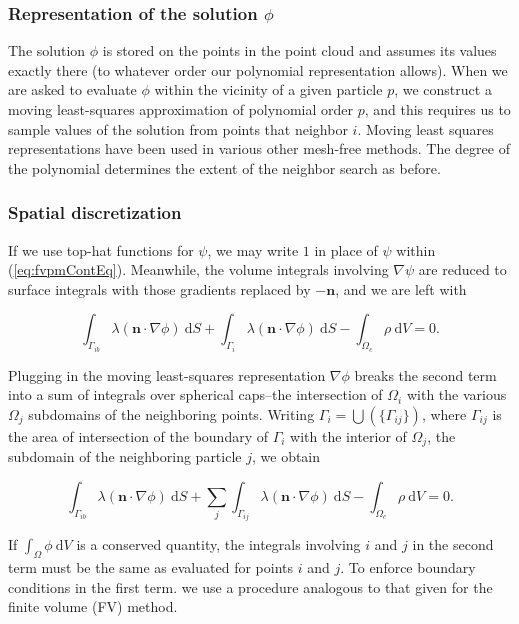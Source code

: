 \documentclass[12pt]{article}
\newcommand{\labelEq}[1]{\label{eq:#1}}
\newcommand{\refEq}[1]{(\ref{eq:#1})}
\renewcommand{\vec}[1]{\mathbf{#1}}
\newcommand{\grad}[1]{\nabla#1}
\newcommand{\dV}{~\mathrm{d}V}
\newcommand{\dS}{~\mathrm{d}S}
\begin{document}
\subsubsection*{Representation of the solution $\phi$}

The solution $\phi$ is stored on the points in the point cloud and assumes its values exactly there (to whatever order our polynomial 
representation allows). When we are asked to evaluate $\phi$ within the vicinity of a given particle $p$, we construct a moving least-squares 
approximation of polynomial order $p$, and this requires us to sample values of the solution from points that neighbor $i$. 
Moving least squares representations have been used in various other mesh-free methods\cite{Dilts1999}.
The degree of the polynomial determines the extent of the neighbor search as before.

\subsubsection*{Spatial discretization}

If we use top-hat functions for $\psi$, we may write $1$ in place of $\psi$ within \refEq{fvpmContEq}.
Meanwhile, the volume integrals involving $\grad{\psi}$ are reduced to surface integrals with those 
gradients replaced by $-\vec{n}$, and we are left with

\begin{equation}
\int_{\Gamma_{ib}} \lambda (\vec{n}\cdot\grad{\phi}) \dS + 
\int_{\Gamma_i} \lambda (\vec{n}\cdot\grad{\phi}) \dS - 
\int_{\Omega_c} \rho \dV = 0. \labelEq{fvpmEqTopHat}
\end{equation}

Plugging in the moving least-squares representation $\grad{\phi}$
breaks the second term into a sum of integrals over spherical caps--the intersection of $\Omega_i$ with the various $\Omega_j$ subdomains of 
the neighboring points. Writing $\Gamma_i = \bigcup(\{\Gamma_{ij}\})$, where $\Gamma_{ij}$ is the area of intersection of the boundary of $\Gamma_i$
with the interior of $\Omega_j$, the subdomain of the neighboring particle $j$, we obtain

\begin{equation}
\int_{\Gamma_{ib}} \lambda (\vec{n}\cdot\grad{\phi}) \dS + 
\sum_j \int_{\Gamma_{ij}} \lambda (\vec{n}\cdot\grad{\phi}) \dS -
\int_{\Omega_c} \rho \dV = 0. \labelEq{fvpmEqTopHat}
\end{equation}

If $\int_\Omega \phi \dV$ is a conserved quantity, the integrals involving $i$ and $j$ in the second term must be the same as evaluated for 
points $i$ and $j$. To enforce boundary conditions in the first term. we use a procedure analogous to that given for the finite volume (FV) method.
\end{document}
